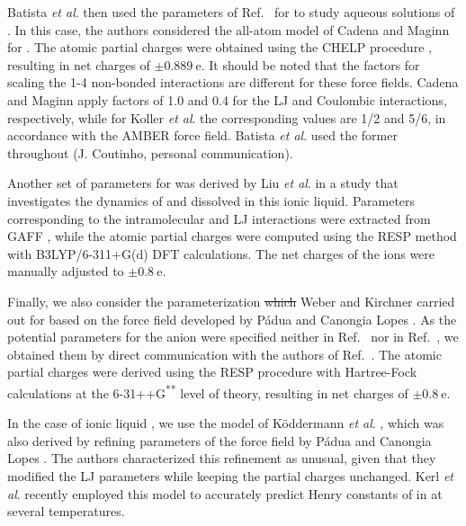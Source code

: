 \documentclass[3p,twocolumn]{elsarticle}
\providecommand{\DIFdel}[1]{{\protect\color{red}\sout{#1}}}                      %
\providecommand{\DIFdelbegin}{} %
\providecommand{\DIFdelend}{} %
\newcommand{\DIFscaledelfig}{0.5}
\newlength{\DIFdelgraphicswidth} %
\newlength{\DIFdelgraphicsheight} %
\newcommand{\DIFdelincludegraphics}[2][]{%
\sbox{\DIFdelgraphicsbox}{\DIFOincludegraphics[#1]{#2}}%
\settoboxwidth{\DIFdelgraphicswidth}{\DIFdelgraphicsbox} %
\settoboxtotalheight{\DIFdelgraphicsheight}{\DIFdelgraphicsbox} %
\scalebox{\DIFscaledelfig}{%
\parbox[b]{\DIFdelgraphicswidth}{\usebox{\DIFdelgraphicsbox}\\[-\baselineskip] \rule{\DIFdelgraphicswidth}{0em}}\llap{\resizebox{\DIFdelgraphicswidth}{\DIFdelgraphicsheight}{%
\setlength{\unitlength}{\DIFdelgraphicswidth}%
\begin{picture}(1,1)%
\thicklines\linethickness{2pt} %
{\color[rgb]{1,0,0}\put(0,0){\framebox(1,1){}}}%
{\color[rgb]{1,0,0}\put(0,0){\line( 1,1){1}}}%
{\color[rgb]{1,0,0}\put(0,1){\line(1,-1){1}}}%
\end{picture}%
}\hspace*{3pt}}} %
} %
\DeclareRobustCommand{\DIFdelbegin}{\DIFOdelbegin \let\includegraphics\DIFdelincludegraphics} %
\DeclareRobustCommand{\DIFdelend}{\DIFOaddend \let\includegraphics\DIFOincludegraphics} %
\begin{document}
Batista \textit{et al}. \cite{Batista_2015} then used the parameters of Ref.~ for \ce{[B(CN)_4]^-} to study aqueous solutions of \ce{[emim][B(CN)_4]}.
In this case, the authors considered the all-atom model of Cadena and Maginn \cite{Cadena_2006} for \ce{[emim]^+}.
The atomic partial charges were obtained using the CHELP procedure \cite{Breneman_1990}, resulting in net charges of $\pm 0.889~\mathrm{e}$.
It should be noted that the factors for scaling the 1-4 non-bonded interactions are different for these force fields.
Cadena and Maginn \cite{Cadena_2006} apply factors of 1.0 and 0.4 for the LJ and Coulombic interactions, respectively, while for Koller \textit{et al}. \cite{Koller_2012} the corresponding values are 1/2 and 5/6, in accordance with the AMBER force field.
Batista \textit{et al}. \cite{Batista_2015} used the former throughout (J. Coutinho, personal communication).

Another set of parameters for \ce{[emim][B(CN)_4]} was derived by Liu \textit{et al}. \cite{Liu_2014} in a study that investigates the dynamics of  and  dissolved in this ionic liquid.
Parameters corresponding to the intramolecular and LJ interactions were extracted from GAFF \cite{Wang_2004}, while the atomic partial charges were computed using the RESP method \cite{Bayly_1993} with B3LYP/6-311+G(d) DFT calculations.
The net charges of the ions were manually adjusted to $\pm 0.8 ~\mathrm{e}$.

Finally, we also consider the parameterization \DIFdelbegin \DIFdel{which }\DIFdelend Weber and Kirchner \cite{Weber_2016} carried out for \ce{[emim][B(CN)_4]} based on the force field developed by P{\'{a}}dua and Canongia Lopes \cite{Canongia_Lopes_2006}.
As the potential parameters for the anion were specified neither in Ref.~ nor in Ref.~, we obtained them by direct communication with the authors of Ref.~.
The atomic partial charges were derived using the RESP procedure with Hartree-Fock calculations at the \mbox{6-31++G\textsuperscript{**}} level of theory, resulting in net charges of $\pm 0.8 ~\mathrm{e}$.

In the case of ionic liquid \ce{[emim][NTf_2]}, we use the model of K\"{o}ddermann \textit{et al}. \cite{Koddermann_2007}, which was also derived by refining parameters of the force field by P{\'{a}}dua and Canongia Lopes \cite{Canongia_Lopes_2006}.
The authors characterized this refinement as unusual, given that they modified the LJ parameters while keeping the partial charges unchanged.
Kerl \textit{et al}. \cite{Kerl__2017} recently employed this model to accurately predict Henry constants of  in \ce{[emim][NTf_2]} at several temperatures.
\end{document}
